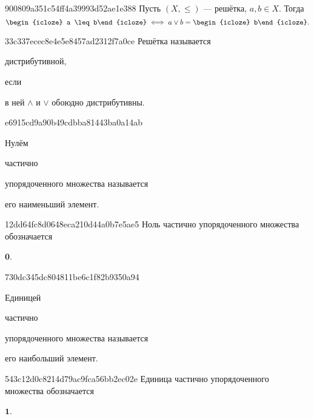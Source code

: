 \begin{note}{900809a351c54ff4a39993d52ae1e388}
    Пусть \({ (X, \leqslant) }\) --- решётка,\: \({ a, b \in X }\).
    Тогда
    \[
        \begin{icloze}{2}a \leq b\end{icloze} \iff a \lor b = \begin{icloze}{1}b\end{icloze}.
    \]
\end{note}

\begin{note}{33c337ecec8e4e5e8457ad2312f7a0ce}
    Решётка называется \begin{icloze}{2}дистрибутивной,\end{icloze} если \begin{icloze}{1}в ней \({ \land }\) и \({ \lor }\) обоюдно дистрибутивны.\end{icloze}
\end{note}

\begin{note}{e6915cd9a90b49cdbba81443ba0a14ab}
    \begin{icloze}{2}Нулём\end{icloze} \begin{icloze}{3}частично\end{icloze} упорядоченного множества называется \begin{icloze}{1}его наименьший элемент.\end{icloze}
\end{note}

\begin{note}{12dd64fc8d0648eca210d44a0b7e5ae5}
    Ноль частично упорядоченного множества обозначается \begin{icloze}{1}\({ \mathbf{0} }\).\end{icloze}
\end{note}

\begin{note}{730dc345dc804811be6c1f82b9350a94}
    \begin{icloze}{2}Единицей\end{icloze} \begin{icloze}{3}частично\end{icloze} упорядоченного множества называется \begin{icloze}{1}его наибольший элемент.\end{icloze}
\end{note}

\begin{note}{543c12d0c8214d79ac9fca56bb2ec02e}
    Единица частично упорядоченного множества обозначается \begin{icloze}{1}\({ \mathbf{1} }\).\end{icloze}
\end{note}

